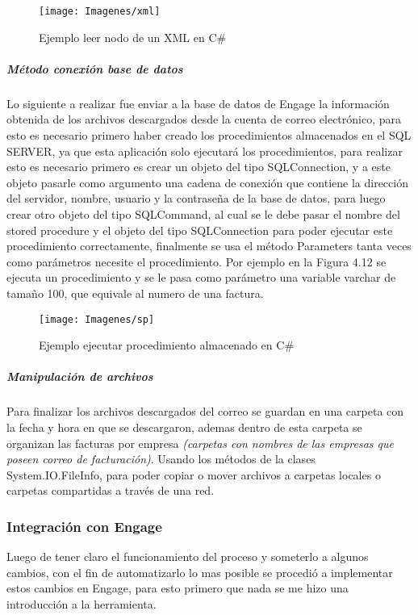 			\begin{figure}[H]
				\centering
				\texttt{[image: Imagenes/xml]}
				\caption{Ejemplo leer nodo de un XML en C$\#$}
			\end{figure}			

			\subparagraph{Método conexión base de datos}
			Lo siguiente a realizar fue enviar a la base de datos de Engage la información obtenida de los archivos descargados desde la cuenta de correo electrónico, para esto es necesario primero haber creado los procedimientos almacenados en el SQL SERVER, ya que esta aplicación solo ejecutará los procedimientos, para realizar esto es necesario primero es crear un objeto del tipo SQLConnection, y a este objeto pasarle como argumento una cadena de conexión que contiene la dirección del servidor, nombre, usuario y la contraseña de la base de datos, para luego crear otro objeto del tipo SQLCommand, al cual se le debe pasar el nombre del stored procedure y el objeto del tipo SQLConnection para poder ejecutar este procedimiento correctamente, finalmente se usa el método Parameters tanta veces como parámetros necesite el procedimiento. Por ejemplo en la Figura 4.12 se ejecuta un procedimiento y se le pasa como parámetro una variable varchar de tamaño 100, que equivale al numero de una factura.
			
			\begin{figure}[H]
				\centering
				\texttt{[image: Imagenes/sp]}
				\caption{Ejemplo ejecutar procedimiento almacenado en C$\#$}
			\end{figure}			

			\subparagraph{Manipulación de archivos}
			Para finalizar los archivos descargados del correo se guardan en una carpeta con la fecha y hora en que se descargaron, ademas dentro de esta carpeta se organizan las facturas por empresa \textit{(carpetas con nombres de las empresas que poseen correo de facturación)}. Usando los métodos de la clases System.IO.FileInfo, para poder copiar o mover archivos a carpetas locales o carpetas compartidas a través de una red.		
		
	\subsubsection{Integración con Engage}
	Luego de tener claro el funcionamiento del proceso y someterlo a algunos cambios, con el fin de automatizarlo lo mas posible se procedió a implementar estos cambios en Engage, para esto primero que nada se me hizo una introducción a la herramienta.

